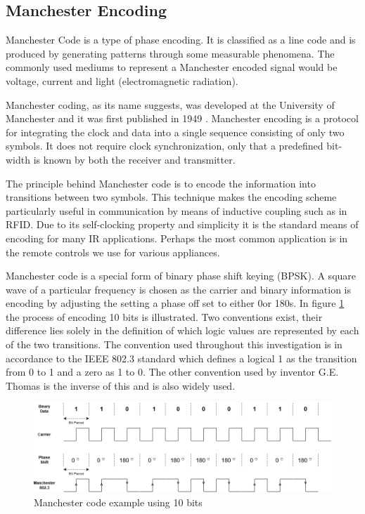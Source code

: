 \subsection{Manchester Encoding}
Manchester Code is a type of phase encoding. It is classified as a line code and is produced by generating patterns through some measurable phenomena. The commonly used mediums to represent a Manchester encoded signal would be voltage, current and light (electromagnetic radiation).

Manchester coding, as its name suggests, was developed at the University of Manchester and it was first published in 1949 \cite{Jameel2019}. Manchester encoding is a protocol for integrating the clock and data into a single sequence consisting of only two symbols. It does not require clock synchronization, only that a predefined bit-width is known by both the receiver and transmitter. 

The principle behind Manchester code is to encode the information into transitions between two symbols. This technique makes the encoding scheme particularly useful in communication by means of inductive coupling such as in RFID. Due to its self-clocking property and simplicity it is the standard means of encoding for many IR applications. Perhaps the most common application is in the remote controls we use for various appliances.

Manchester code is a special form of binary phase shift keying (BPSK). A square wave of a particular frequency is chosen as the carrier and binary information is encoding by adjusting the setting a phase off set to either 0\degree or 180\degree s. In figure \ref{fig:manchesterencoding} the process of encoding 10 bits is illustrated. Two conventions exist, their difference lies solely in the definition of which logic values are represented by each of the two transitions. The convention used throughout this investigation is in accordance to the IEEE 802.3 standard which defines a logical 1 as the transition from 0 to 1 and a zero as 1 to 0. The other convention used by inventor G.E. Thomas is the inverse of this and is also widely used.\\

\begin{figure}[H]
	\centering
	\includegraphics[width=0.7\linewidth]{figures/litreview/manchester_encoding}
	\caption{Manchester code example using 10 bits}
	\label{fig:manchesterencoding}
\end{figure}

